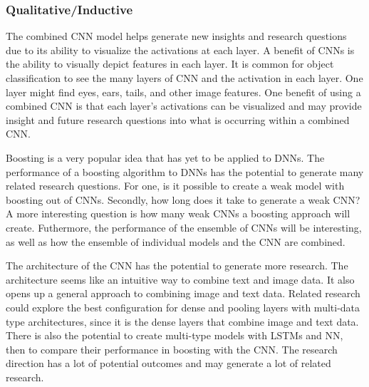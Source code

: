 \subsubsection{Qualitative/Inductive}

The combined CNN model helps generate new insights and research questions due to its ability to visualize the activations at each layer.  A benefit of CNNs is the ability to visually depict features in each layer.  It is common for object classification to see the many layers of CNN and the activation in each layer.  One layer might find eyes, ears, tails, and other image features.  One benefit of using a combined CNN is that each layer's activations can be visualized and may provide insight and future research questions into what is occurring within a combined CNN.  

Boosting is a very popular idea that has yet to be applied to DNNs.  The performance of a boosting algorithm to DNNs has the potential to generate many related research questions.  For one, is it possible to create a weak model with boosting out of CNNs.  Secondly, how long does it take to generate a weak CNN?  A more interesting question is how many weak CNNs a boosting approach will create.  Futhermore, the performance of the ensemble of CNNs will be interesting, as well as how the ensemble of individual models and the CNN are combined.

The architecture of the CNN has the potential to generate more research.  The architecture seems like an intuitive way to combine text and image data.  It also opens up a general approach to combining image and text data.  Related research could explore the best configuration for dense and pooling layers with multi-data type architectures, since it is the dense layers that combine image and text data.  There is also the potential to create multi-type models with LSTMs and NN, then to compare their performance in boosting with the CNN.  The research direction has a lot of potential outcomes and may generate a lot of related research.

